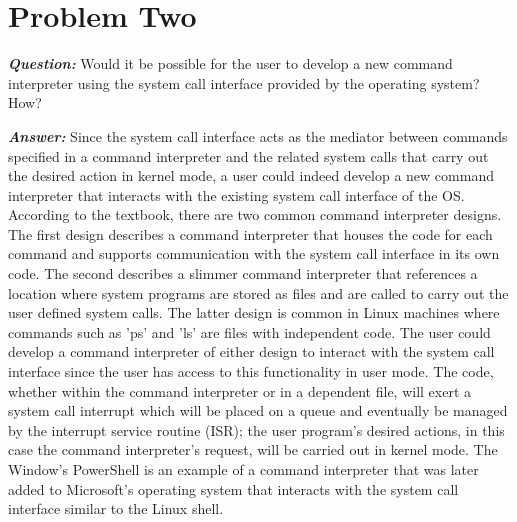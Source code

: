 \documentclass[letterpaper, 10pt,DIV=13]{scrartcl}
\numberwithin{equation}{section} %
\numberwithin{figure}{section} %
\numberwithin{table}{section} %
\begin{document}
\section{Problem Two}

\textbf{\emph{Question:}}
Would it be possible for the user to develop a new command interpreter using the system call interface provided by the operating system? How?

\textbf{\emph{Answer:}}
Since the system call interface acts as the mediator between commands specified in a command interpreter and the related system calls that carry out the desired action in kernel mode, a user could indeed develop a new command interpreter that interacts with the existing system call interface of the OS. According to the textbook, there are two common command interpreter designs. The first design describes a command interpreter that houses the code for each command and supports communication with the system call interface in its own code. The second describes a slimmer command interpreter that references a location where system programs are stored as files and are called to carry out the user defined system calls\cite{concepts}. The latter design is common in Linux machines where commands such as 'ps' and 'ls' are files with independent code. The user could develop a command interpreter of either design to interact with the system call interface since the user has access to this functionality in user mode. The code, whether within the command interpreter or in a dependent file, will exert a system call interrupt which will be placed on a queue and eventually be managed by the interrupt service routine (ISR); the user program's desired actions, in this case the command interpreter's request, will be carried out in kernel mode. The Window's PowerShell is an example of a command interpreter that was later added to Microsoft's operating system that interacts with the system call interface similar to the Linux shell. 




 
\end{document}
